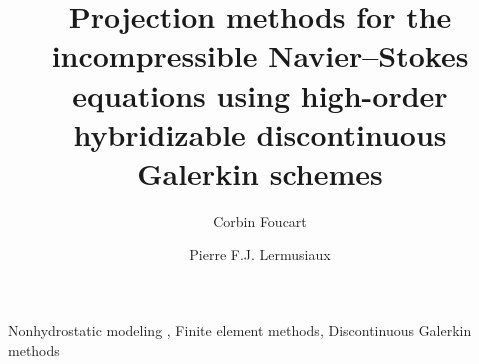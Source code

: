 \documentclass[preprint,10pt,numbers]{elsarticle}
\begin{document}
\begin{frontmatter}


\title{Projection methods for the incompressible Navier--Stokes equations using high-order hybridizable discontinuous Galerkin schemes}%


\author[MechE]{Corbin Foucart}
\author[MechE]{Pierre F.J. Lermusiaux}


\begin{abstract}

\end{abstract}

\begin{keyword}
Nonhydrostatic modeling \sep
Finite element methods\sep
Discontinuous Galerkin methods
\end{keyword}

\end{frontmatter}

\clearpage
\appendix

%

{\footnotesize

}
\end{document}
